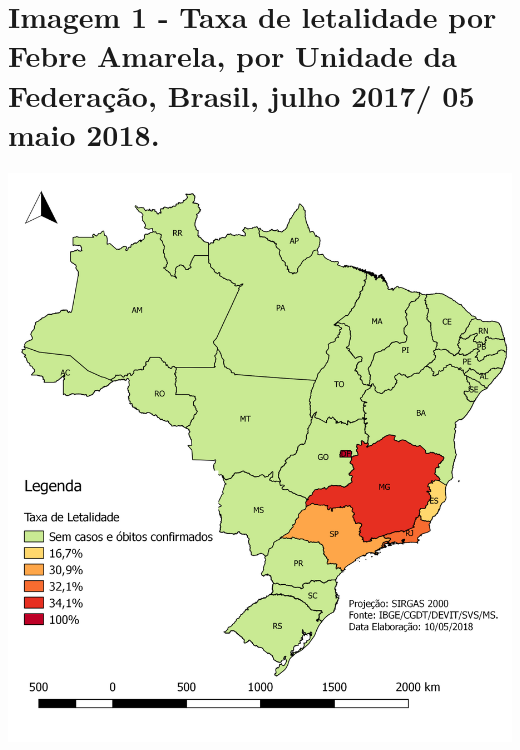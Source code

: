 \documentclass{article}
\begin{document}
     
     
     
     
\newpage
	\section*{\large{Imagem 1 - Taxa de letalidade por Febre Amarela, por Unidade da Federação, Brasil, julho 2017/ 05 maio 2018.}} %
    \centering
    \includegraphics[width=.8\textwidth]{mapa_alteravel_boletim_epidemi.png} %
    
\end{document}
